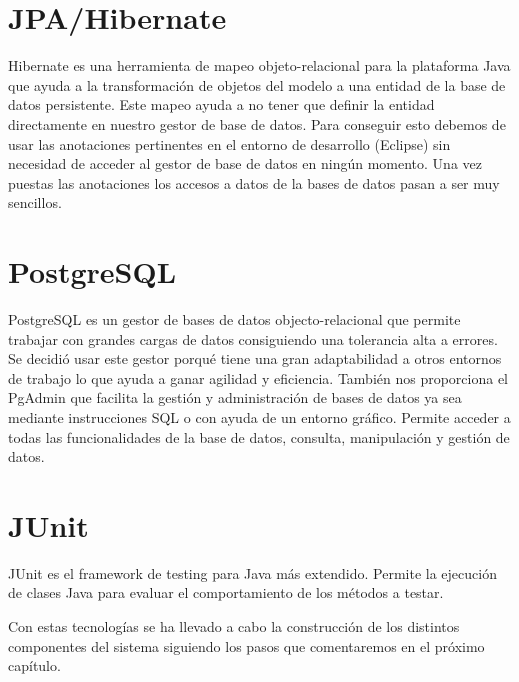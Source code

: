 \section{JPA/Hibernate}
Hibernate es una herramienta de mapeo objeto-relacional para la plataforma Java que ayuda a la transformación de objetos del modelo a una entidad de la base de datos persistente. Este mapeo ayuda a  no tener que definir la entidad directamente en nuestro gestor de base de datos. Para conseguir esto debemos de usar las anotaciones pertinentes en el entorno de desarrollo (Eclipse) sin necesidad de acceder al gestor de base de datos en ningún momento. Una vez puestas las anotaciones los accesos a datos de la  bases de datos pasan a ser muy sencillos.





\section{PostgreSQL}
PostgreSQL es un gestor de bases de datos objecto-relacional  que permite trabajar con grandes cargas de datos consiguiendo una tolerancia alta a errores.
Se decidió usar este gestor porqué tiene una gran adaptabilidad a otros entornos de trabajo lo que ayuda a ganar agilidad y eficiencia. También nos proporciona  el PgAdmin que facilita la gestión y administración de bases de datos ya sea mediante instrucciones SQL o con ayuda de un entorno gráfico. Permite acceder a todas las funcionalidades de la base de datos, consulta, manipulación y gestión de datos.
\section{JUnit}
JUnit es el framework de testing para Java más extendido.
Permite la ejecución de clases Java para evaluar el comportamiento de los métodos a testar.


\vspace{1cm}

Con estas tecnologías se ha llevado a cabo la construcción de los distintos componentes del sistema siguiendo los pasos que comentaremos en el próximo capítulo.
